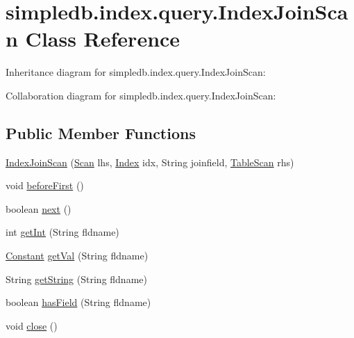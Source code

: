 \hypertarget{classsimpledb_1_1index_1_1query_1_1IndexJoinScan}{}\section{simpledb.\+index.\+query.\+Index\+Join\+Scan Class Reference}
\label{classsimpledb_1_1index_1_1query_1_1IndexJoinScan}


Inheritance diagram for simpledb.\+index.\+query.\+Index\+Join\+Scan\+:


Collaboration diagram for simpledb.\+index.\+query.\+Index\+Join\+Scan\+:
\subsection*{Public Member Functions}
\begin{DoxyCompactItemize}
\item 
\hyperlink{classsimpledb_1_1index_1_1query_1_1IndexJoinScan_aef4763781164462054a641f5f82f5a0e}{Index\+Join\+Scan} (\hyperlink{interfacesimpledb_1_1query_1_1Scan}{Scan} lhs, \hyperlink{interfacesimpledb_1_1index_1_1Index}{Index} idx, String joinfield, \hyperlink{classsimpledb_1_1record_1_1TableScan}{Table\+Scan} rhs)
\item 
void \hyperlink{classsimpledb_1_1index_1_1query_1_1IndexJoinScan_abbdd650c312ffc1ba633f57f5988fb85}{before\+First} ()
\item 
boolean \hyperlink{classsimpledb_1_1index_1_1query_1_1IndexJoinScan_a5d91dbe6fb77001095d3fc0830bb2d24}{next} ()
\item 
int \hyperlink{classsimpledb_1_1index_1_1query_1_1IndexJoinScan_aa18e11532e9379d49fac3b9b3cd6f0a6}{get\+Int} (String fldname)
\item 
\hyperlink{classsimpledb_1_1query_1_1Constant}{Constant} \hyperlink{classsimpledb_1_1index_1_1query_1_1IndexJoinScan_a8a554a0f56fcfe981c302e4929e2c211}{get\+Val} (String fldname)
\item 
String \hyperlink{classsimpledb_1_1index_1_1query_1_1IndexJoinScan_adf3610c0e68bc8491ec7d6d887b71a59}{get\+String} (String fldname)
\item 
boolean \hyperlink{classsimpledb_1_1index_1_1query_1_1IndexJoinScan_a2079804951f64581efd8cc1ef6af297b}{has\+Field} (String fldname)
\item 
void \hyperlink{classsimpledb_1_1index_1_1query_1_1IndexJoinScan_a2746415c838f22a234167417f8c538b6}{close} ()
\end{DoxyCompactItemize}


